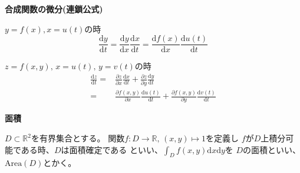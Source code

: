 \documentclass[12pt,b5paper]{ltjsarticle}
\begin{document}
\hrulefill

\textbf{合成関数の微分(連鎖公式)}

$y=f(x),x=u(t)$の時
\begin{equation}
 \frac{\mathrm{d}y}{\mathrm{d}t}
  = \frac{\mathrm{d}y}{\mathrm{d}x}\frac{\mathrm{d}x}{\mathrm{d}t}
  = \frac{\mathrm{d}f(x)}{\mathrm{d}x}\frac{\mathrm{d}u(t)}{\mathrm{d}t}
\end{equation}

$z=f(x,y),\, x=u(t),\,y=v(t)$の時
\begin{align}
 \frac{\mathrm{d}z}{\mathrm{d}t}
   =& \frac{\partial z}{\partial x}\frac{\mathrm{d}x}{\mathrm{d}t}
     + \frac{\partial z}{\partial y}\frac{\mathrm{d}y}{\mathrm{d}t}\\
   =& \frac{\partial f(x,y)}{\partial x}\frac{\mathrm{d}u(t)}{\mathrm{d}t}
     + \frac{\partial f(x,y)}{\partial y}\frac{\mathrm{d}v(t)}{\mathrm{d}t}
\end{align}

\dotfill


\textbf{面積}

$D\subset\mathbb{R}^2$を有界集合とする。
関数$f:D\rightarrow\mathbb{R},\, (x,y)\mapsto 1$を定義し
$f$が$D$上積分可能である時、$D$は面積確定である
といい、$\int_{D}f(x,y)\mathrm{d}x\mathrm{d}y$を
$D$の面積といい、$\mathrm{Area}(D)$とかく。

\hrulefill
\end{document}
